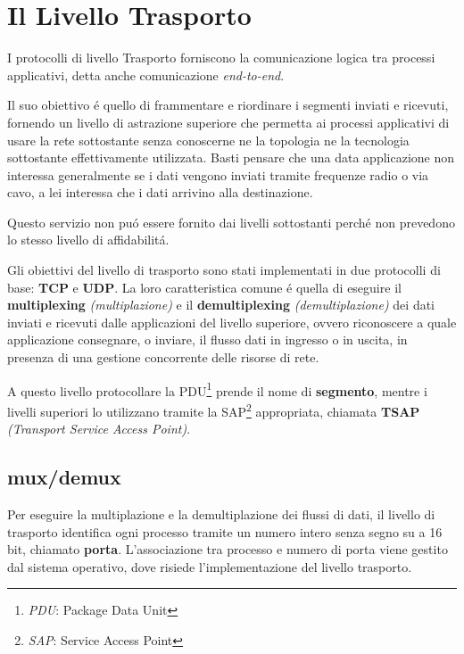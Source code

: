 \documentclass[12pt]{article}
\begin{document}
\date{}
\title{\vspace{-11ex}} %
 
\maketitle

\section{Il Livello Trasporto}\label{livello-trasporto}
I protocolli di livello Trasporto forniscono la comunicazione logica tra processi 
applicativi, detta anche comunicazione \textit{end-to-end}. 

Il suo obiettivo \'e quello di frammentare e riordinare i segmenti inviati e ricevuti, fornendo un livello di 
astrazione superiore che permetta ai processi applicativi di usare la rete sottostante senza conoscerne ne la 
topologia ne la tecnologia sottostante effettivamente utilizzata. Basti pensare che una data applicazione non 
interessa generalmente se i dati vengono inviati tramite frequenze radio o via cavo, a lei interessa che i dati 
arrivino alla destinazione.

Questo servizio non pu\'o essere fornito dai livelli sottostanti perch\'e non prevedono lo stesso livello di 
affidabilit\'a.

Gli obiettivi del livello di trasporto sono stati implementati in due protocolli di base: \textbf{TCP} e 
\textbf{UDP}. La loro caratteristica comune \'e quella di eseguire il \textbf{multiplexing} \textit{(multiplazione)} 
e il \textbf{demultiplexing} \textit{(demultiplazione)} dei dati inviati e ricevuti dalle applicazioni del livello 
superiore, ovvero riconoscere a quale applicazione consegnare, o inviare, il flusso dati in ingresso o in uscita, in 
presenza di una gestione concorrente delle risorse di rete.

A questo livello protocollare la PDU\footnote{\textit{PDU}: Package Data Unit} prende il nome di \textbf{segmento}, 
mentre i livelli superiori lo utilizzano tramite la SAP\footnote{\textit{SAP}: Service Access Point} appropriata, 
chiamata \textbf{TSAP} \textit{(Transport Service Access Point)}.

\subsection{mux/demux}\label{livello-trasporto-mux-demux}
Per eseguire la multiplazione e la demultiplazione dei flussi di dati, il livello di trasporto identifica ogni 
processo tramite un numero intero senza segno su a 16 bit, chiamato \textbf{porta}. L'associazione tra processo e 
numero di porta viene gestito dal sistema operativo, dove risiede l'implementazione del livello trasporto.
\end{document}
